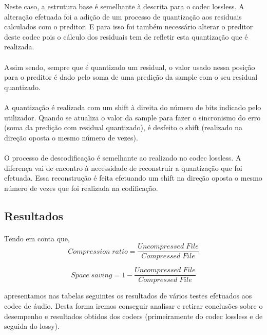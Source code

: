 \documentclass{report}
\begin{document}
Neste caso, a estrutura base é semelhante à descrita para o codec lossless.
A alteração efetuada foi a adição de um processo de quantização aos residuais calculados com o preditor.
E para isso foi também necessário alterar o preditor deste codec pois o cálculo dos residuais
tem de refletir esta quantização que é realizada. 
\paragraph{}
Assim sendo, sempre que é quantizado um residual, o valor usado nessa posição para o preditor é dado pelo soma de uma predição da
sample com o seu residual quantizado. 
\paragraph{}
A quantização é realizada com um shift à direita do número de bits indicado pelo utilizador.
Quando se atualiza o valor da sample para fazer o sincronismo do erro (soma da predição com
residual quantizado), é desfeito o shift (realizado na direção oposta o mesmo número de vezes).
\paragraph{}
O processo de descodificação é semelhante ao realizado no codec lossless. A diferença vai de encontro à necessidade de reconstruir a quantização que foi efetuada. Essa
reconstrução é feita efetuando um shift na direção oposta o mesmo número de vezes que foi realizada na codificação.

\subsection*{Resultados}
\paragraph{}Tendo em conta que,
\begin{equation}
    Compression \; ratio= \dfrac{Uncompressed \; File}{Compressed \; File}
\end{equation}

\begin{equation}
    Space \; saving = 1 - \dfrac{Uncompressed \; File}{Compressed \; File}
\end{equation}

apresentamos nas tabelas seguintes os resultados de vários testes efetuados aos codec de áudio. Desta forma iremos conseguir analisar e retirar conclusões sobre o desempenho e resultados obtidos dos codecs (primeiramente do codec lossless e de seguida do lossy). 
\end{document}
